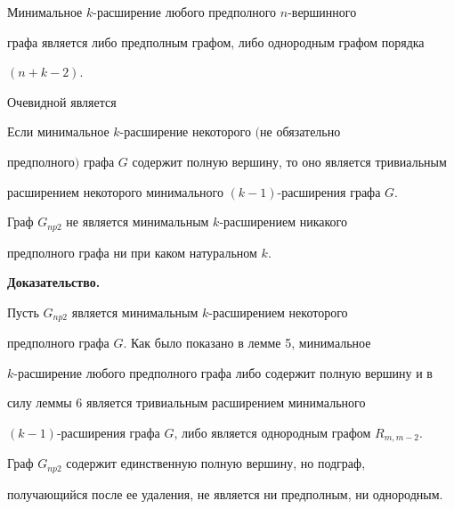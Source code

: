 \begin{cor}


Минимальное $k$-расширение любого предполного $n$-вершинного


графа является либо предполным графом, либо однородным графом порядка


$(n+k-2)$.


\end{cor}





Очевидной является





\begin{lem}


Если минимальное $k$-расширение некоторого $($не обязательно


предполного$)$ графа $G$ содержит полную вершину, то оно является тривиальным


расширением некоторого минимального $(k-1)$-расширения графа $G$.


\end{lem}





\begin{lem}


Граф $G_{np2}$ не является минимальным $k$-расширением никакого


предполного графа ни при каком натуральном $k$.


\end{lem}





{\bf Доказательство.}


Пусть $G_{np2}$ является минимальным $k$-расширением некоторого


предполного графа $G$. Как было показано в лемме 5, минимальное


$k$-расширение любого предполного графа либо содержит полную вершину и в


силу леммы 6 является тривиальным расширением минимального


$(k-1)$-расширения графа $G$, либо является однородным графом $R_{m,m-2}$.


Граф $G_{np2}$ содержит единственную полную вершину, но подграф,


получающийся после ее удаления, не является ни предполным, ни однородным.





